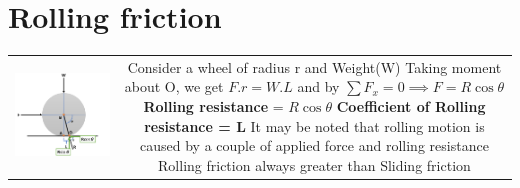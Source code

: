 \documentclass[8pt]{report}
\begin{document}
\section{Rolling friction}
	\begin{table}[H]
		\begin{tabular}{cc}
			\parbox{4cm}{\includegraphics[scale=0.4]{rollingfriction.png}} & \hspace{2cm}
			\parbox{12cm}{Consider a wheel of radius r and Weight(W) \\\\ Taking moment about O, we get $F.r = W.L$ and by $\sum F_x=0 \implies F = R\cos\theta$ \\\\ \textbf{Rolling resistance} = $R\cos\theta$ \\\\ \textbf{Coefficient of Rolling resistance = L}\\\\ It may be noted that rolling motion is caused by a couple of applied force and rolling resistance\\\\Rolling friction always greater than Sliding friction}
		\end{tabular}
	\end{table}\hrulefill
\end{document}

